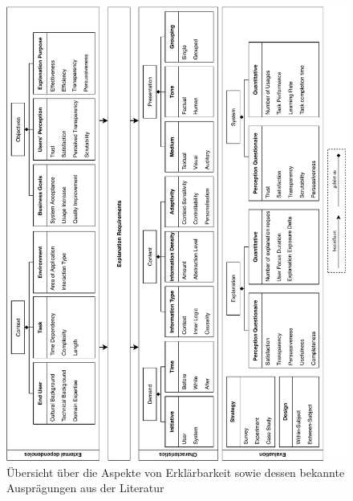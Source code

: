\begin{figure}[htb!]
    \begin{center}
        \includegraphics[width=\textwidth]{contents/05_model_description/res/model_complete_overview.pdf}
    \end{center}
    \caption{Übersicht über die Aspekte von Erklärbarkeit sowie dessen bekannte Ausprägungen aus der Literatur}
    \label{fig:model_overview_complete}
\end{figure}

\newpage
